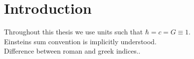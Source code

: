\chapter{Introduction}
Throughout this thesis we use units such that $\hbar = c = G \equiv 1$. \\
Einsteins sum convention is implicitly understood. \\
Difference between roman and greek indices..